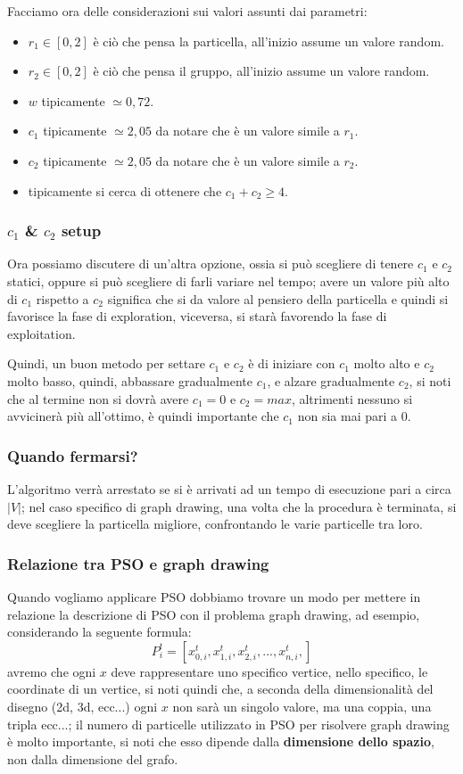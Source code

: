 \documentclass[12pt,a4paper]{article}
\begin{document}
Facciamo ora delle considerazioni sui valori assunti dai parametri:
\begin{itemize}
\item $r_1 \in [0, 2]$ è ciò che pensa la particella, all'inizio assume un valore random.
\item $r_2 \in [0, 2]$ è ciò che pensa il gruppo, all'inizio assume un valore random.
\item $w$ tipicamente $\simeq 0,72$.
\item $c_1$ tipicamente $\simeq 2,05$ da notare che è un valore simile a $r_1$.
\item $c_2$ tipicamente $\simeq 2,05$ da notare che è un valore simile a $r_2$.
\item tipicamente si cerca di ottenere che $c_1 + c_2 \geq 4$.
\end{itemize}

\subsubsection{$c_1$ \& $c_2$ setup}
Ora possiamo discutere di un'altra opzione, ossia si può scegliere di tenere $c_1$ e $c_2$ statici, oppure si può scegliere di farli variare nel tempo; avere un valore più alto di $c_1$ rispetto a $c_2$ significa che si da valore al pensiero della particella e quindi si favorisce la fase di exploration, viceversa, si starà favorendo la fase di exploitation.

Quindi, un buon metodo per settare $c_1$ e $c_2$ è di iniziare con $c_1$ molto alto e $c_2$ molto basso, quindi, abbassare gradualmente $c_1$, e alzare gradualmente $c_2$, si noti che al termine non si dovrà avere $c_1 = 0$ e $c_2 = max$, altrimenti nessuno si avvicinerà più all'ottimo, è quindi importante che $c_1$ non sia mai pari a $0$.

\subsubsection{Quando fermarsi?}
L'algoritmo verrà arrestato se si è arrivati ad un tempo di esecuzione pari a circa $\vert V \vert$; nel caso specifico di graph drawing, una volta che la procedura è terminata, si deve scegliere la particella migliore, confrontando le varie particelle tra loro.

\subsubsection{Relazione tra PSO e graph drawing}
Quando vogliamo applicare PSO dobbiamo trovare un modo per mettere in relazione la descrizione di PSO con il problema graph drawing, ad esempio, considerando la seguente formula:
$$P_i^{t} = [ x_{0, i}^{t}, x_{1, i}^{t}, x_{2, i}^{t}, ... ,x_{n, i}^{t},] $$
avremo che ogni $x$ deve rappresentare uno specifico vertice, nello specifico, le coordinate di un vertice, si noti quindi che, a seconda della dimensionalità del disegno (2d, 3d, ecc...) ogni $x$ non sarà un singolo valore, ma una coppia, una tripla ecc...; il numero di particelle utilizzato in PSO per risolvere graph drawing è molto importante, si noti che esso dipende dalla \textbf{dimensione dello spazio}, non dalla dimensione del grafo.
\end{document}
